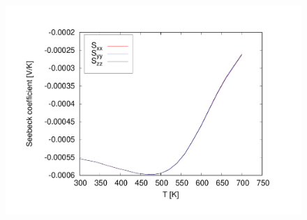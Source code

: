 \begin{itemize}
\begin{figure}[h!]
\centering
\includegraphics[width=0.7\columnwidth]{figure/example16/Si_seebeck_vs_T.pdf}
\caption{}\label{fig16.5}
\end{figure}
\end{itemize}

